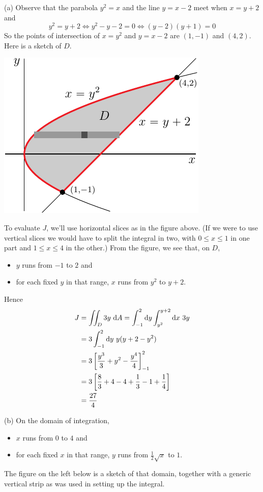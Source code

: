 \begin{solution}
(a) Observe that the parabola $y^2=x$ and the line $y=x-2$ meet
when $x=y+2$ and
\begin{equation*}
y^2=y+2
\iff y^2-y-2=0
\iff (y-2)(y+1)=0
\end{equation*}
So the points of intersection of $x=y^2$ and $y=x-2$ are $(1,-1)$
and $(4,2)$. Here is a sketch of $D$.

\begin{center}
     \includegraphics{fig/OE10D_5aa.pdf}
\end{center}

To evaluate $J$, we'll use horizontal slices as in the figure above.
(If we were to use vertical slices we would have to split the integral in two,
with $0\le x\le 1$ in one part and $1\le x\le 4$ in the other.)
From the figure, we see that, on $D$,
\begin{itemize}
\item
$y$ runs from $-1$ to $2$ and
\item 
for each fixed $y$ in that range, $x$ runs from $y^2$ to $y+2$.
\end{itemize}
Hence
\begin{align*}
J &=\iint_D 3y\ \mathrm{d}A
  =\int_{-1}^2\mathrm{d}y\int_{y^2}^{y+2}\mathrm{d}x\ 3y \\
  &=3\int_{-1}^2\mathrm{d}y\ y(y+2-y^2) \\
  &=3\left[\frac{y^3}{3}+y^2-\frac{y^4}{4}\right]_{-1}^2 \\
  &=3\left[\frac{8}{3}+4-4+\frac{1}{3}-1+\frac{1}{4}\right] \\
  &=\frac{27}{4}
\end{align*}

(b) 
On the domain of integration,
\begin{itemize}
\item
$x$ runs from $0$ to $4$ and
\item 
for each fixed $x$ in that range, $y$ runs from $\frac{1}{2}\sqrt{x}$ to $1$.
\end{itemize}
The figure on the left below is a sketch of that domain, together with 
a generic vertical strip as was used in setting up the integral.


\end{solution}
